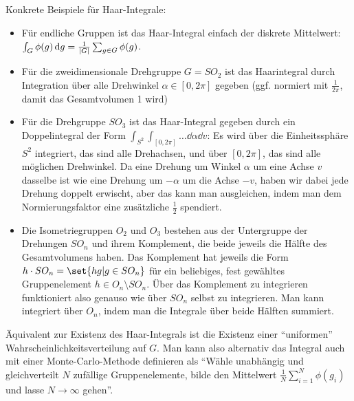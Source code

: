 \begin{definition}
	Konkrete Beispiele für Haar-Integrale:
	
	\begin{itemize}
	\item Für endliche Gruppen ist das Haar-Integral einfach der diskrete Mittelwert: $\int_G \phi(g) \,\textrm{d} g = \frac{1}{\lvert G\rvert} \sum_{g\in G} \phi(g)$.
	\item Für die zweidimensionale Drehgruppe $G=SO_2$ ist das Haarintegral durch Integration über alle Drehwinkel $\alpha\in[0,2\pi]$ gegeben (ggf. normiert mit $\frac{1}{2\pi}$, damit das Gesamtvolumen 1 wird)
	\item Für die Drehgruppe $SO_3$ ist das Haar-Integral gegeben durch ein Doppelintegral der Form $\int_{S^2} \int_{[0,2\pi]} \ldots \dd \alpha \dd v$: Es wird über die Einheitssphäre $S^2$ integriert, das sind alle Drehachsen, und über $[0,2\pi]$, das sind alle möglichen Drehwinkel. Da eine Drehung um Winkel $\alpha$ um eine Achse $v$ dasselbe ist wie eine Drehung um $-\alpha$ um die Achse $-v$, haben wir dabei jede Drehung doppelt erwischt, aber das kann man ausgleichen, indem man dem Normierungsfaktor eine zusätzliche $\frac{1}{2}$ spendiert.
	\item Die Isometriegruppen $O_2$ und $O_3$ bestehen aus der Untergruppe der Drehungen $SO_n$ und ihrem Komplement, die beide jeweils die Hälfte des Gesamtvolumens haben. Das Komplement hat jeweils die Form $h\cdot SO_n = \set{hg | g\in SO_n}$ für ein beliebiges, fest gewähltes Gruppenelement $h\in O_n \setminus SO_n$. Über das Komplement zu integrieren funktioniert also genauso wie über $SO_n$ selbst zu integrieren. Man kann integriert über $O_n$, indem man die Integrale über beide Hälften summiert.
	\end{itemize}
	
	Äquivalent zur Existenz des Haar-Integrals ist die Existenz einer \enquote{uniformen} Wahrscheinlichkeitsverteilung auf $G$. Man kann also alternativ das Integral auch mit einer Monte-Carlo-Methode definieren als \enquote{Wähle unabhängig und gleichverteilt $N$ zufällige Gruppenelemente, bilde den Mittelwert $\frac{1}{N} \sum_{i=1}^N \phi(g_i)$ und lasse $N\to\infty$ gehen}.
\end{definition}

